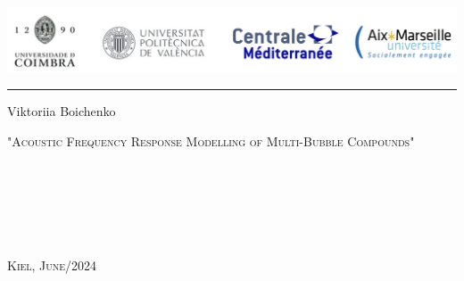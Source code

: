 \documentclass[a4paper,11pt]{article}
\begin{document}

\begin{titlepage}

\begin{minipage}{0.96\linewidth}
\centering
\includegraphics[width=\linewidth]{figures/universities.png}
\end{minipage}
\vspace{20pt}
\hrule
\vspace{5pt}

\begin{center}
    \vfill
    {
        \LARGE{}
        \vspace{0.5cm}
        \Large
    }   


    \vfill
    
    \Large{Viktoriia Boichenko}
    
    \vfill

    \LARGE\textsc{"Acoustic Frequency Response Modelling of Multi-Bubble Compounds"}
\end{center}

\vfill

\begin{minipage}[t]{0.5\linewidth}
     \medskip\\
     \medskip\\
     \medskip\\
\end{minipage}
\begin{minipage}[t]{0.5\linewidth}
\end{minipage}

\vfill

\begin{minipage}[t]{0.5\linewidth}
    \textsc{} \medskip\\
\end{minipage}
\begin{minipage}[t]{0.5\linewidth}
    \large\textsc{Kiel, June/2024}\medskip\\
\end{minipage}

\end{titlepage}
%     
\end{document}
